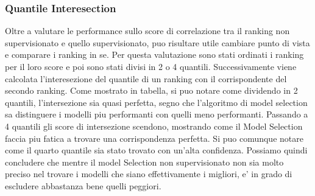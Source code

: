 \subsubsection{Quantile Interesection}
Oltre a valutare le performance sullo score di correlazione tra il ranking non supervisionato e quello supervisionato, puo risultare utile cambiare punto di vista e comparare i ranking in se.
Per questa valutazione sono stati ordinati i ranking per il loro score e poi sono stati divisi in 2 o 4 quantili. Successivamente viene calcolata l'interesezione del quantile di un ranking con il corrispondente del secondo ranking.
Come mostrato in tabella, si puo notare come dividendo in 2 quantili, l'intersezione sia quasi perfetta, segno che l'algoritmo di model selection sa distinguere i modelli piu performanti con quelli meno performanti.
Passando a 4 quantili gli score di intersezione scendono, mostrando come il Model Selection faccia piu fatica a trovare una corrispondenza perfetta. Si puo comunque notare come il quarto quantile sia stato trovato con un'alta confidenza.
Possiamo quindi concludere che mentre il model Selection non supervisionato non sia molto preciso nel trovare i modelli che siano effettivamente i migliori, e' in grado di escludere abbastanza bene quelli peggiori.

